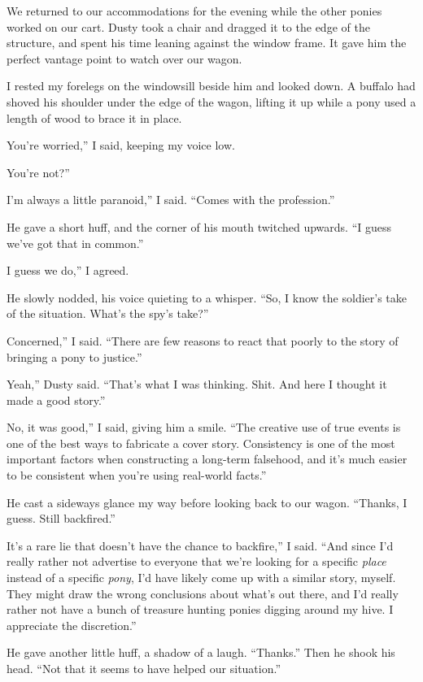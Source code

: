 We returned to our accommodations for the evening while the other ponies worked on our cart. Dusty took a chair and dragged it to the edge of the structure, and spent his time leaning against the window frame. It gave him the perfect vantage point to watch over our wagon.

I rested my forelegs on the windowsill beside him and looked down. A buffalo had shoved his shoulder under the edge of the wagon, lifting it up while a pony used a length of wood to brace it in place.

\leavevmode{}You’re worried,” I said, keeping my voice low.

\leavevmode{}You’re not?”

\leavevmode{}I’m always a little paranoid,” I said. “Comes with the profession.”

He gave a short huff, and the corner of his mouth twitched upwards. “I guess we’ve got that in common.”

\leavevmode{}I guess we do,” I agreed.

He slowly nodded, his voice quieting to a whisper. “So, I know the soldier’s take of the situation. What’s the spy’s take?”

\leavevmode{}Concerned,” I said. “There are few reasons to react that poorly to the story of bringing a pony to justice.”

\leavevmode{}Yeah,” Dusty said. “That’s what I was thinking. Shit. And here I thought it made a good story.”

\leavevmode{}No, it was good,” I said, giving him a smile. “The creative use of true events is one of the best ways to fabricate a cover story. Consistency is one of the most important factors when constructing a long-term falsehood, and it’s much easier to be consistent when you’re using real-world facts.”

He cast a sideways glance my way before looking back to our wagon. “Thanks, I guess. Still backfired.”

\leavevmode{}It’s a rare lie that doesn’t have the chance to backfire,” I said. “And since I’d really rather not advertise to everyone that we’re looking for a specific \textit{place} instead of a specific \textit{pony}, I’d have likely come up with a similar story, myself. They might draw the wrong conclusions about what’s out there, and I’d really rather not have a bunch of treasure hunting ponies digging around my hive. I appreciate the discretion.”

He gave another little huff, a shadow of a laugh. “Thanks.” Then he shook his head. “Not that it seems to have helped our situation.”

